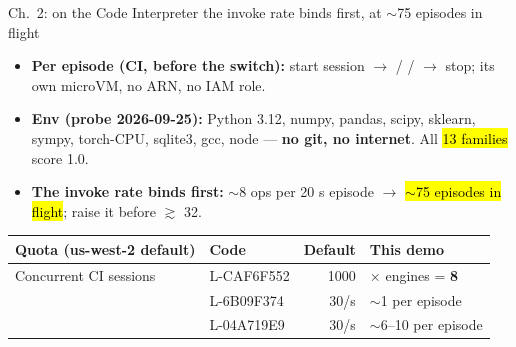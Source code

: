 \begin{frame}{Ch.\ 2: on the Code Interpreter the invoke rate binds first, at $\sim$75 episodes in flight}
\begin{itemize}\footnotesize\setlength{\itemsep}{1.4mm}
\item \textbf{Per episode (CI, before the switch):} start session $\rightarrow$  /  /  $\rightarrow$ stop; its own microVM, no ARN, no IAM role.
\item \textbf{Env (probe 2026-09-25):} Python 3.12, numpy, pandas, scipy, sklearn, sympy, torch-CPU, sqlite3, gcc, node --- \textbf{no git, no internet}. All \hl{13 families} score 1.0.
\item \textbf{The invoke rate binds first:} $\sim$8 ops per 20 s episode $\rightarrow$ \hl{$\sim$75 episodes in flight}; raise it before  $\gtrsim$ 32.
\end{itemize}
\vspace{2mm}
\footnotesize
\begin{tabularx}{\textwidth}{@{}Y l r l@{}}
\toprule
\textbf{Quota (us-west-2 default)} & \textbf{Code} & \textbf{Default} & \textbf{This demo}\\
\midrule
Concurrent CI sessions & L-CAF6F552 & 1000 &  $\times$ engines = \textbf{8}\\
 & L-6B09F374 & 30/s & $\sim$1 per episode\\
 & L-04A719E9 & 30/s & $\sim$6--10 per episode\\
\bottomrule
\end{tabularx}
\end{frame}

